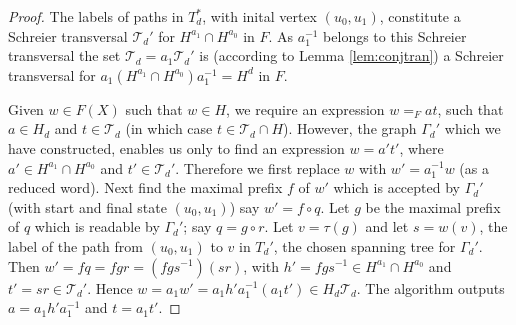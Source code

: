 \documentclass[a4paper,12pt]{article}
\newcommand{\G}{\Gamma }
\renewcommand{\t}{\tau }
\numberwithin{equation}{section}
\numberwithin{figure}{section}
\newcommand{\cT}{\mathcal{T}}
\begin{document}
\begin{proof}
The labels of paths in $T_d^*$, with inital vertex $(u_0,u_1)$,
 constitute 
a Schreier transversal $\cT_d'$ for $H^{a_1}\cap H^{a_0}$ in  $F$.
As $a_1^{-1}$ belongs to this Schreier transversal the set 
$\cT_d=a_1\cT_d'$ is (according to Lemma \ref{lem:conjtran}) 
a Schreier transversal for $a_1(H^{a_1}\cap H^{a_0})a_1^{-1}=H^d$ in $F$. 
 
Given $w\in F(X)$ such that $w\in H$, we require 
an expression $w=_F a t$, such that $a\in H_d$ and $t\in \cT_d$ 
(in which case $t\in \cT_d\cap H$). However, the graph $\G_d'$ 
 which we have constructed, enables us only to find an expression
$w=a't'$, where $a'\in H^{a_1}\cap H^{a_0}$ and $t'\in \cT_d'$. Therefore
we first replace $w$ with  
  $w'=a_1^{-1}w$ (as a reduced word).  
 Next find the maximal
prefix $f$ of $w' $ which is accepted by $\G_{d}'$ (with
start and final state $(u_0,u_1)$) say $w'=f\circ q$.
Let $g$ be the maximal
 prefix of $q$ which is readable by $\G_{d}'$; say $q=g\circ r$. Let 
$v=\t(g)$ and let $s=w(v)$, the label of the path from $(u_0,u_1)$ 
to $v$ in $T_d'$, the chosen spanning tree for $\G_d'$. 
Then $w'=fq=fgr=(fgs^{-1})(sr)$, with $h'=fgs^{-1}\in H^{a_1}\cap H^{a_0}$ 
and $t'=sr\in \cT_d'$. Hence 
$w=a_1w'=a_1 h' a_1^{-1}(a_1t')\in H_d \cT_d$. The algorithm outputs
 $a=  a_1 h' a_1^{-1}$ and $t=a_1t'$. 
\end{proof}
\end{document}
